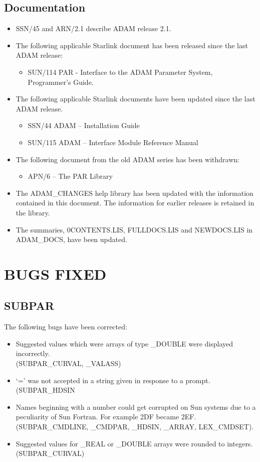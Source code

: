 \subsection{Documentation}
\label{docs}
\begin{itemize}
\item SSN/45 and ARN/2.1 describe ADAM release 2.1.
\item The following applicable Starlink document has been released since
 the last ADAM release:
\begin{itemize}
\item SUN/114 PAR - Interface to the ADAM Parameter System, Programmer's Guide.
\end{itemize}
\item The following applicable Starlink documents have been updated since the
last ADAM release.
\begin{itemize}
\item SSN/44 ADAM -- Installation Guide
\item SUN/115 ADAM -- Interface Module Reference Manual
\end{itemize}
\item The following document from the old ADAM series has been withdrawn:
\begin{itemize}
\item APN/6 -- The PAR Library
\end{itemize}
\item The ADAM\_CHANGES help library has been updated
with the information contained in this document. The information for earlier
releases is
retained in the library.
\item The summaries, 0CONTENTS.LIS, FULLDOCS.LIS and NEWDOCS.LIS in
ADAM\-\_DOCS, have been updated.
\end{itemize}

\section{BUGS FIXED}

\subsection{SUBPAR}
The following bugs have been corrected:
\begin{itemize}
\item Suggested values which were arrays of type \_DOUBLE were displayed
incorrectly.\\
(SUBPAR\_CURVAL, \_VALASS)
\item `=' was not accepted in a string given in response to a prompt.\\
(SUBPAR\_HDSIN
\item Names beginning with a number could get corrupted on Sun systems due to
a peculiarity of Sun Fortran.
For example 2DF became 2EF.
(SUBPAR\_CMDLINE, \_CMDPAR, \_HDSIN, \_ARRAY, LEX\_CMDSET).
\item Suggested values for \_REAL or \_DOUBLE arrays were rounded to integers.\\
(SUBPAR\_CURVAL)
\end{itemize}

